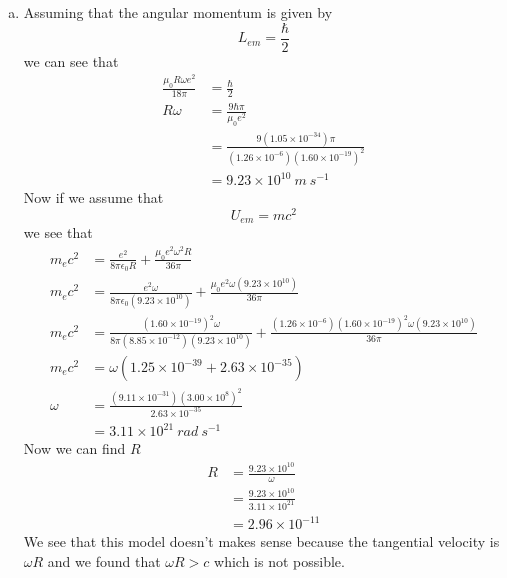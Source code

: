 \documentclass[11pt]{article}
\numberwithin{equation}{section}
\begin{document}
\begin{enumerate}[(a)]
\item
Assuming that the angular momentum is given by
$$L_{em} = \frac{\hbar}{2}$$
we can see that
\begin{align*}
\frac{\mu_0R\omega e^2}{18\pi} &= \frac{\hbar}{2}\\
R\omega &= \frac{9\hbar\pi}{\mu_0e^2}\\
&= \frac{9(1.05\times10^{-34})\pi}{(1.26\times10^{-6})(1.60\times10^{-19})^2}\\
&= 9.23\times10^{10}\ m\ s^{-1}
\end{align*}
Now if we assume that 
$$U_{em} = mc^2$$
we see that
\begin{align*}
m_ec^2 &= \frac{e^2}{8\pi\epsilon_0R}+\frac{\mu_0e^2\omega^2R}{36\pi}\\
m_ec^2 &= \frac{e^2\omega}{8\pi\epsilon_0(9.23\times10^{10})}+\frac{\mu_0e^2\omega(9.23\times10^{10})}{36\pi}\\
m_ec^2 &= \frac{(1.60\times10^{-19})^2\omega}{8\pi(8.85\times10^{-12})(9.23\times10^{10})}+\frac{(1.26\times10^{-6})(1.60\times10^{-19})^2\omega(9.23\times10^{10})}{36\pi}\\
m_ec^2 &= \omega(1.25\times10^{-39}+2.63\times10^{-35})\\
\omega &= \frac{(9.11\times10^{-31})(3.00\times10^{8})^2}{2.63\times10^{-35}}\\
&= 3.11\times10^{21}\ rad\ s^{-1}
\end{align*}
Now we can find $R$
\begin{align*}
R &= \frac{9.23\times10^{10}}{\omega}\\
&= \frac{9.23\times10^{10}}{3.11\times10^{21}}\\
&= 2.96\times10^{-11}
\end{align*}
We see that this model doesn't makes sense because the tangential velocity is $\omega R$ and we found that $\omega R>c$ which is not possible.
\end{enumerate}
\end{document}

